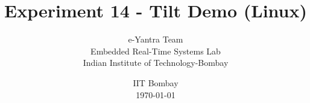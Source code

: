 \documentclass[table,10pt,red]{beamer}	%
\title
[

	\hspace{0.5cm}
	Page \insertframenumber/\inserttotalframenumber
]
{
Experiment 14 - Tilt Demo (Linux)
}
\author
[
	www.e-yantra.org 	%
]
{
	e-Yantra Team \\
  Embedded Real-Time Systems Lab\\
  Indian Institute of Technology-Bombay \\
}
\date
{
IIT Bombay \\ {\today}	%
}
\begin{document}

\begin{frame}	%
	\titlepage %
\end{frame}
\end{document}
